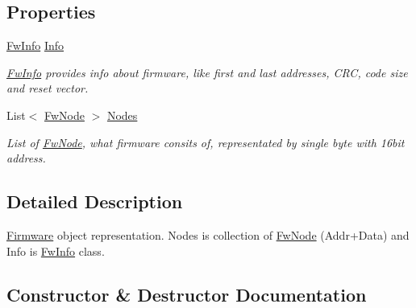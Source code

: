 \subsection*{Properties}
\begin{DoxyCompactItemize}
\item 
\mbox{\hyperlink{class_b_s_l430___n_e_t_1_1_firmware_tools_1_1_fw_tools_1_1_fw_info}{Fw\+Info}} \mbox{\hyperlink{class_b_s_l430___n_e_t_1_1_firmware_tools_1_1_fw_tools_1_1_firmware_ab0d46ec0a0f7ddfdd93e2fc0407a78b8}{Info}}
\begin{DoxyCompactList}\small\item\em \mbox{\hyperlink{class_b_s_l430___n_e_t_1_1_firmware_tools_1_1_fw_tools_1_1_fw_info}{Fw\+Info}} provides info about firmware, like first and last addresses, C\+RC, code size and reset vector. \end{DoxyCompactList}\item 
List$<$ \mbox{\hyperlink{class_b_s_l430___n_e_t_1_1_firmware_tools_1_1_fw_tools_1_1_fw_node}{Fw\+Node}} $>$ \mbox{\hyperlink{class_b_s_l430___n_e_t_1_1_firmware_tools_1_1_fw_tools_1_1_firmware_a5538ddda063e61683bc7ce23d329afc2}{Nodes}}
\begin{DoxyCompactList}\small\item\em List of \mbox{\hyperlink{class_b_s_l430___n_e_t_1_1_firmware_tools_1_1_fw_tools_1_1_fw_node}{Fw\+Node}}, what firmware consits of, representated by single byte with 16bit address. \end{DoxyCompactList}\end{DoxyCompactItemize}


\subsection{Detailed Description}
\mbox{\hyperlink{class_b_s_l430___n_e_t_1_1_firmware_tools_1_1_fw_tools_1_1_firmware}{Firmware}} object representation. Nodes is collection of \mbox{\hyperlink{class_b_s_l430___n_e_t_1_1_firmware_tools_1_1_fw_tools_1_1_fw_node}{Fw\+Node}} (Addr+\+Data) and Info is \mbox{\hyperlink{class_b_s_l430___n_e_t_1_1_firmware_tools_1_1_fw_tools_1_1_fw_info}{Fw\+Info}} class. 



\subsection{Constructor \& Destructor Documentation}
\mbox{\label{class_b_s_l430___n_e_t_1_1_firmware_tools_1_1_fw_tools_1_1_firmware_ade815c90607d3ca2499a1d192ede9362}} 
